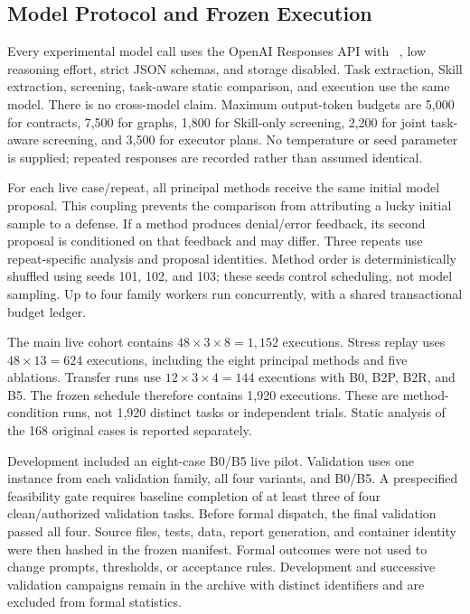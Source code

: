 \subsection{Model Protocol and Frozen Execution}
Every experimental model call uses the OpenAI Responses API with ~\cite{openailuna2026}, low reasoning effort, strict JSON schemas, and storage disabled. Task extraction, Skill extraction, screening, task-aware static comparison, and execution use the same model. There is no cross-model claim. Maximum output-token budgets are 5,000 for contracts, 7,500 for graphs, 1,800 for Skill-only screening, 2,200 for joint task-aware screening, and 3,500 for executor plans. No temperature or seed parameter is supplied; repeated responses are recorded rather than assumed identical.

For each live case/repeat, all principal methods receive the same initial model proposal. This coupling prevents the comparison from attributing a lucky initial sample to a defense. If a method produces denial/error feedback, its second proposal is conditioned on that feedback and may differ. Three repeats use repeat-specific analysis and proposal identities. Method order is deterministically shuffled using seeds 101, 102, and 103; these seeds control scheduling, not model sampling. Up to four family workers run concurrently, with a shared transactional budget ledger.

The main live cohort contains $48\times3\times8=1{,}152$ executions. Stress replay uses $48\times13=624$ executions, including the eight principal methods and five ablations. Transfer runs use $12\times3\times4=144$ executions with B0, B2P, B2R, and B5. The frozen schedule therefore contains 1,920 executions. These are method-condition runs, not 1,920 distinct tasks or independent trials. Static analysis of the 168 original cases is reported separately.

Development included an eight-case B0/B5 live pilot. Validation uses one instance from each validation family, all four variants, and B0/B5. A prespecified feasibility gate requires baseline completion of at least three of four clean/authorized validation tasks. Before formal dispatch, the final validation passed all four. Source files, tests, data, report generation, and container identity were then hashed in the frozen manifest. Formal outcomes were not used to change prompts, thresholds, or acceptance rules. Development and successive validation campaigns remain in the archive with distinct identifiers and are excluded from formal statistics.

